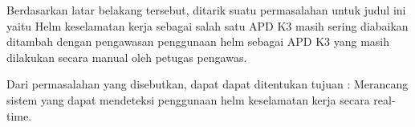 Berdasarkan latar belakang tersebut, ditarik suatu permasalahan untuk judul ini yaitu Helm keselamatan kerja sebagai salah satu APD K3 masih sering diabaikan ditambah dengan pengawasan penggunaan helm sebagai APD K3 yang masih dilakukan secara manual oleh petugas pengawas.

Dari permasalahan yang disebutkan, dapat dapat ditentukan tujuan : Merancang sistem yang dapat mendeteksi penggunaan helm keselamatan kerja secara real-time.
